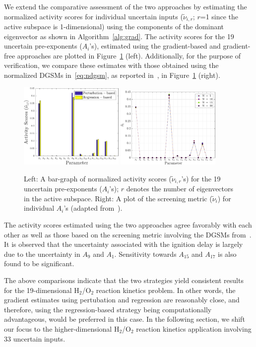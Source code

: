 We extend the comparative assessment of the two approaches by estimating
the normalized activity scores for individual uncertain inputs ($\tilde{\nu}_{i,r}$; $r$=1 since the
active subspace is 1-dimensional)
using the components of the dominant eigenvector as shown in Algorithm~\ref{alg:grad}.
The activity scores for the 19 uncertain pre-exponents ($A_i$'s), estimated
using the gradient-based and gradient-free approaches are plotted in
Figure~\ref{fig:comp_as} (left).  Additionally, for the purpose of
verification, we compare these estimates with those obtained using the
normalized DGSMs in~\eqref{eq:ndgsm}, as reported in~\cite{Vohra:2018}, in
Figure~\ref{fig:comp_as} (right). 
%
\begin{figure}[htbp]
 \begin{center}
  \includegraphics[width=0.45\textwidth]{./Figures/comp_as}
  \includegraphics[width=0.45\textwidth]{./Figures/ub_conv_kinetics_rich}
\caption{Left: A bar-graph of normalized activity scores ($\tilde{\nu}_{i,r}$'s) 
for the 19 uncertain pre-exponents ($A_i$'s); $r$
denotes the number of eigenvectors in the active subspace.
Right: A plot of the screening metric ($\tilde{\nu}_i$) for individual $A_i$'s 
(adapted from~\cite{Vohra:2018}).}
\label{fig:comp_as}
\end{center}
\end{figure}
%
The activity scores estimated using the two approaches agree favorably with each other as well as those
based on the screening metric involving the DGSMs from~\cite{Vohra:2018}. It is observed that the uncertainty
associated with the ignition delay is largely due to the uncertainty in $A_9$ and $A_1$. Sensitivity towards
$A_{15}$ and $A_{17}$ is also found to be significant. 

The above comparisons indicate that the two strategies yield consistent results for the 19-dimensional
H$_2$/O$_2$ reaction kinetics problem. In other words, the gradient estimates using pertubation and
regression are reasonably close, and therefore, using the regression-based strategy being computationally
advantageous, would be preferred in this case. In the following section, we shift our focus to 
the higher-dimensional H$_2$/O$_2$ reaction kinetics application involving 33 uncertain inputs. 
